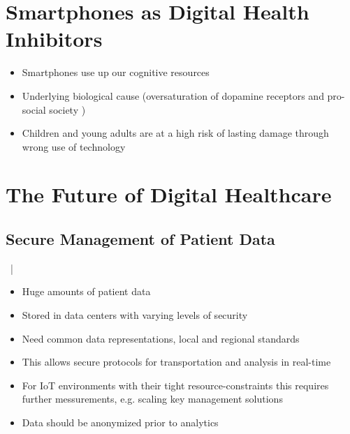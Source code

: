 \documentclass[xcolor=dvipsnames, aspectratio=1610]{beamer}
\begin{document}
\section{Smartphones as Digital Health Inhibitors}%
\label{sec:smartphones_as_digital_health_inhibitors}

\begin{frame}{\secname}
    \begin{itemize}[<+->]
        \item Smartphones use up our cognitive resources \cite{ward2017brain}
        \item Underlying biological cause (oversaturation of dopamine receptors \cite{nieoullon2002dopamine, dopamineRole} and pro-social society \cite{sapiens})
        \item Children and young adults are at a high risk of lasting damage through wrong use of technology \cite{crone2018media}
    \end{itemize}
\end{frame}

\section{The Future of Digital Healthcare}%
\label{sec:the_future_of_digital_healthcare}

\subsection{Secure Management of Patient Data}%
\label{sub:secure_management_of_patient_data}

\begin{frame}{\secname\ | \subsecname}
    \begin{itemize}[<+->]
        \item Huge amounts of patient data \cite{gopal2019digital}
        \item Stored in data centers with varying levels of security \cite{patil2014big}
        \item Need common data representations, local and regional standards \cite{patil2014big}
        \item This allows secure protocols for transportation and analysis in real-time \cite{patil2014big}
        \item For IoT environments with their tight resource-constraints this requires further messurements, e.g. scaling key management solutions \cite{patil2014big}
        \item Data should be anonymized prior to analytics
    \end{itemize}
\end{frame}
\end{document}
